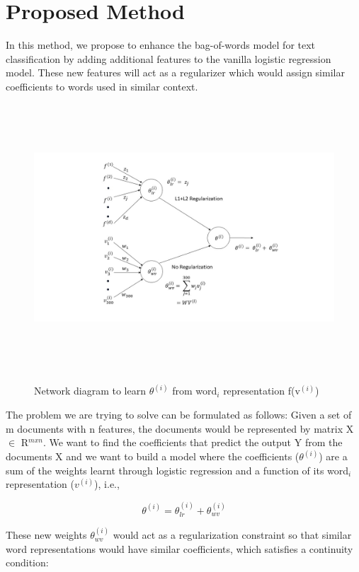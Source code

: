 \section{Proposed Method}

In this method, we propose to enhance the bag-of-words model for text classification by adding additional features to the vanilla logistic regression model. These new features will act as a regularizer which would assign similar coefficients to words used in similar context.

\begin{figure}
\centering
\includegraphics[width=16cm, height=10cm]{images/Fig3.jpg}\\
\centering
\caption{Network diagram to learn $\theta^{(i)}$ from word$_{i}$ representation f(v$^{(i)}$)}
\label{fig:foo}
\end{figure}

The problem we are trying to solve can be formulated as follows: Given a set of m documents with n features, the documents would be represented by matrix X $\in$ R$^{m x n}$. We want to find the coefficients that predict the output Y from the documents X and we want to build a model where the coefficients ($\theta^{(i)}$) are a sum of the weights learnt through logistic regression and a function of its word$_{i}$ representation ($v^{(i)}$), i.e.,

\begin{equation}\label{lb1}
\theta^{(i)} = \theta_{lr}^{(i)} + \theta_{wv}^{(i)}
\end{equation}

These new weights $\theta_{wv}^{(i)}$ would act as a regularization constraint so that similar word representations would have similar coefficients, which satisfies a continuity condition:

